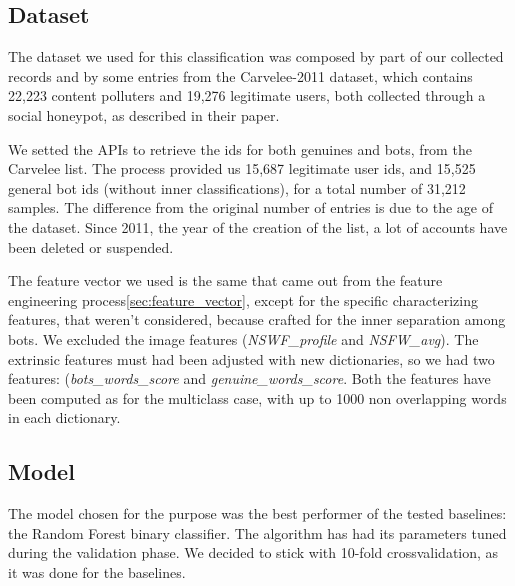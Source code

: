 \subsection{Dataset}
The dataset we used for this classification was composed by part of our collected records and by some entries from the Carvelee-2011 dataset, which contains 22,223 content polluters and 19,276 legitimate users, both collected through a social honeypot, as described in their paper\cite{Lee11sevenmonths}.

We setted the APIs to retrieve the ids for both genuines and bots, from the Carvelee list. The process provided us 15,687 legitimate user ids, and 15,525 general bot ids (without inner classifications), for a total number of 31,212 samples.
The difference from the original number of entries is due to the age of the dataset. Since 2011, the year of the creation of the list, a lot of accounts have been deleted or suspended.

The feature vector we used is the same that came out from the feature engineering process\ref{sec:feature_vector}, except for the specific characterizing features, that weren't considered, because crafted for the inner separation among bots. We excluded the image features (\textit{NSWF\_profile} and \textit{NSFW\_avg}).
The extrinsic features must had been adjusted with new dictionaries, so we had two features: (\textit{bots\_words\_score} and  \textit{genuine\_words\_score}.
Both the features have been computed as for the multiclass case, with up to 1000 non overlapping words in each dictionary.

\subsection{Model}
The model chosen for the purpose was the best performer of the tested baselines: the Random Forest binary classifier.
The algorithm has had its parameters tuned during the validation phase.
We decided to stick with 10-fold crossvalidation, as it was done for the baselines.

